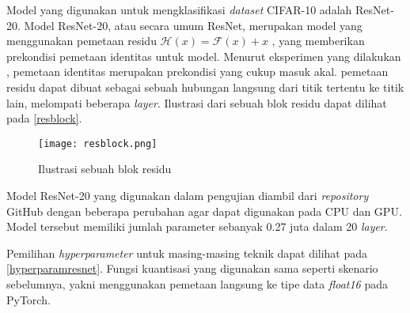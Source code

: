 Model yang digunakan untuk mengklasifikasi \emph{dataset} CIFAR-10 adalah ResNet-20. Model ResNet-20, atau secara umum ResNet, merupakan model yang menggunakan pemetaan residu $\mathcal{H}(x) = \mathcal{F}(x) + x$ \parencite{he2015deep}, yang memberikan prekondisi pemetaan identitas untuk model. Menurut eksperimen yang dilakukan \textcite{he2015deep}, pemetaan identitas merupakan prekondisi yang cukup masuk akal. pemetaan residu dapat dibuat sebagai sebuah hubungan langsung dari titik tertentu ke titik lain, melompati beberapa \emph{layer}. Ilustrasi dari sebuah blok residu dapat dilihat pada \autoref{resblock}.

\begin{figure}[htb]
  \centering
  \texttt{[image: resblock.png]}
  \caption{Ilustrasi sebuah blok residu \parencite{he2015deep}}\label{resblock}
\end{figure}

Model ResNet-20 yang digunakan dalam pengujian diambil dari \emph{repository} GitHub \cite{Idelbayev18a} dengan beberapa perubahan agar dapat digunakan pada CPU dan GPU. Model tersebut memiliki jumlah parameter sebanyak 0.27 juta dalam 20 \emph{layer}.

Pemilihan \emph{hyperparameter} untuk masing-masing teknik dapat dilihat pada \autoref{hyperparamresnet}. Fungsi kuantisasi yang digunakan sama seperti skenario sebelumnya, yakni menggunakan pemetaan langsung ke tipe data \emph{float16} pada PyTorch.

